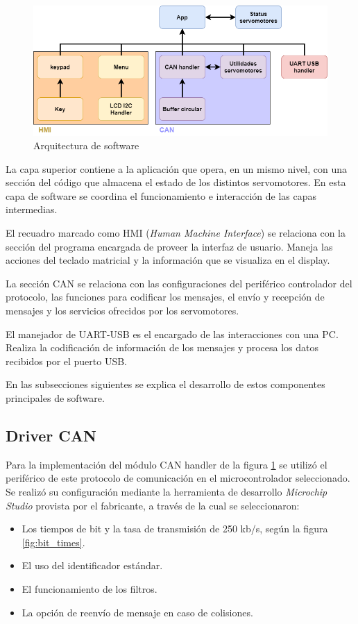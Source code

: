 \begin{figure}[htbp]
	\centering
	\includegraphics[scale=.5]{./Figures/arquitectura_software.png}
	\caption{Arquitectura de software}
	\label{fig:arq_software}
\end{figure}

La capa superior contiene a la aplicación que opera, en un mismo nivel, con una sección del código que almacena el estado de los distintos servomotores. En esta capa de software se coordina el funcionamiento e interacción de las capas intermedias.

El recuadro marcado como HMI (\textit{Human Machine Interface}) se relaciona con la sección del programa encargada de proveer la interfaz de usuario. Maneja las acciones del teclado matricial y la información que se visualiza en el display.

La sección CAN se relaciona con las configuraciones del periférico controlador del protocolo, las funciones para codificar los mensajes, el envío y recepción de mensajes y los servicios ofrecidos por los servomotores.

El manejador de UART-USB es el encargado de las interacciones con una PC. Realiza la codificación de información de los mensajes y procesa los datos recibidos por el puerto USB. 

En las subsecciones siguientes se explica el desarrollo de estos componentes principales de software.

\subsection{Driver CAN}

Para la implementación del módulo CAN handler de la figura \ref{fig:arq_software} se utilizó el periférico de este protocolo de comunicación en el microcontrolador seleccionado. Se realizó su configuración mediante la herramienta de desarrollo \textit{Microchip Studio} provista por el fabricante\citep{web_microchip_studio}, a través de la cual se seleccionaron:
\begin{itemize}
	\item Los tiempos de bit y la tasa de transmisión de 250 kb/s, según la figura \ref{fig:bit_times}.
	\item El uso del identificador estándar.
	\item El funcionamiento de los filtros.
	\item La opción de reenvío de mensaje en caso de colisiones.
\end{itemize}


